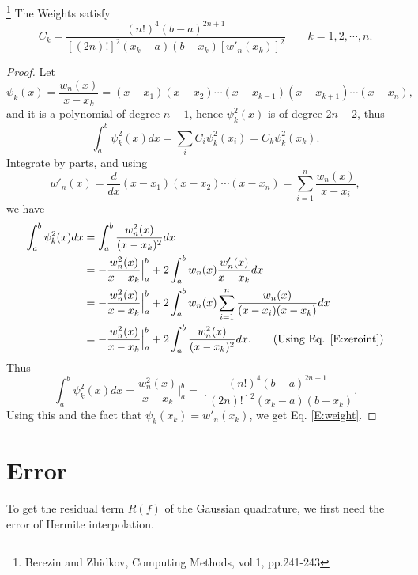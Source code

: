 \begin{lemma}
\footnote{Berezin and Zhidkov, Computing Methods, vol.1, pp.241-243}
The Weights satisfy
\begin{equation} \label{E:weight}
  C_k = \frac{(n!)^4 (b-a)^{2n+1}}{ [(2n)!]^2 (x_k-a) (b-x_k) [w'_n(x_k)]^2 }
    \qquad k=1,2,\cdots,n.
\end{equation}
\end{lemma}
\begin{proof}
Let 
\[
  \psi_k(x) = \frac{w_n(x)}{x-x_k}
    = (x-x_1)(x-x_2)\cdots (x-x_{k-1})(x-x_{k+1})\cdots (x-x_n),
\]
and it is a polynomial of degree $n-1$, hence $\psi_k^2(x)$ is of degree $2n-2$,
thus
\[
  \int_a^b \psi_k^2(x) dx = \sum_i C_i \psi_k^2(x_i) = C_k \psi_k^2(x_k).
\]
Integrate by parts, and using
\[
  w'_n(x) = \frac{d}{dx} (x-x_1)(x-x_2)\cdots (x-x_n) 
          = \sum_{i=1}^n \frac{w_n(x)}{x-x_i},
\]
we have
\begin{align*}
  \int_a^b \psi_k^2(x) dx 
    &= \int_a^b \frac{w_n^2(x)}{(x-x_k)^2} dx  \notag \\
    &= - \frac{w_n^2(x)}{x-x_k}\Big|^b_a + 2\int_a^b w_n(x)\frac{w'_n(x)}{x-x_k} dx
      \notag \\
    &= - \frac{w_n^2(x)}{x-x_k} \Big|^b_a 
       + 2\int_a^b w_n(x) \sum_{i=1}^n \frac{w_n(x)}{(x-x_i)(x-x_k)} dx 
      \notag \\
    &= - \frac{w_n^2(x)}{x-x_k} \Big|^b_a 
       + 2\int_a^b \frac{w_n^2(x)}{(x-x_k)^2} dx.
       \qquad \text{(Using Eq. \ref{E:zeroint})}
      \notag \\
\end{align*}
Thus
\[
  \int_a^b \psi_k^2(x) dx = \frac{w_n^2(x)}{x-x_k} \Big|^b_a 
    = \frac{(n!)^4 (b-a)^{2n+1}}{ [(2n)!]^2 (x_k-a) (b-x_k) }.
\]
Using this and the fact that $\psi_k(x_k)=w'_n(x_k)$, we get Eq. \ref{E:weight}.
\end{proof}


\section{Error}
To get the residual term $R(f)$ of the Gaussian quadrature, we first need the
error of Hermite interpolation.


